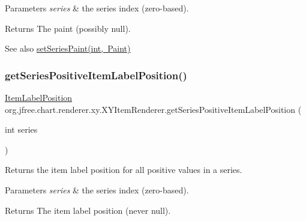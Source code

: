 \begin{DoxyParams}{Parameters}
{\em series} & the series index (zero-\/based).\\
\hline
\end{DoxyParams}
\begin{DoxyReturn}{Returns}
The paint (possibly {\ttfamily null}).
\end{DoxyReturn}
\begin{DoxySeeAlso}{See also}
\mbox{\hyperlink{interfaceorg_1_1jfree_1_1chart_1_1renderer_1_1xy_1_1_x_y_item_renderer_aeae40c1db9ca25301052d076e7d06b46}{set\+Series\+Paint(int, Paint)}} 
\end{DoxySeeAlso}
\mbox{\label{interfaceorg_1_1jfree_1_1chart_1_1renderer_1_1xy_1_1_x_y_item_renderer_ad43ae7b5ccf295ef85f6a9960d593c3d}} 
\subsubsection{\texorpdfstring{get\+Series\+Positive\+Item\+Label\+Position()}{getSeriesPositiveItemLabelPosition()}}
{\footnotesize\ttfamily \mbox{\hyperlink{classorg_1_1jfree_1_1chart_1_1labels_1_1_item_label_position}{Item\+Label\+Position}} org.\+jfree.\+chart.\+renderer.\+xy.\+X\+Y\+Item\+Renderer.\+get\+Series\+Positive\+Item\+Label\+Position (\begin{DoxyParamCaption}\item[{int}]{series }\end{DoxyParamCaption})}

Returns the item label position for all positive values in a series.


\begin{DoxyParams}{Parameters}
{\em series} & the series index (zero-\/based).\\
\hline
\end{DoxyParams}
\begin{DoxyReturn}{Returns}
The item label position (never {\ttfamily null}). 
\end{DoxyReturn}
\mbox{\label{interfaceorg_1_1jfree_1_1chart_1_1renderer_1_1xy_1_1_x_y_item_renderer_ac84c5f4c56b840b3c53cf69cf6504994}} 
